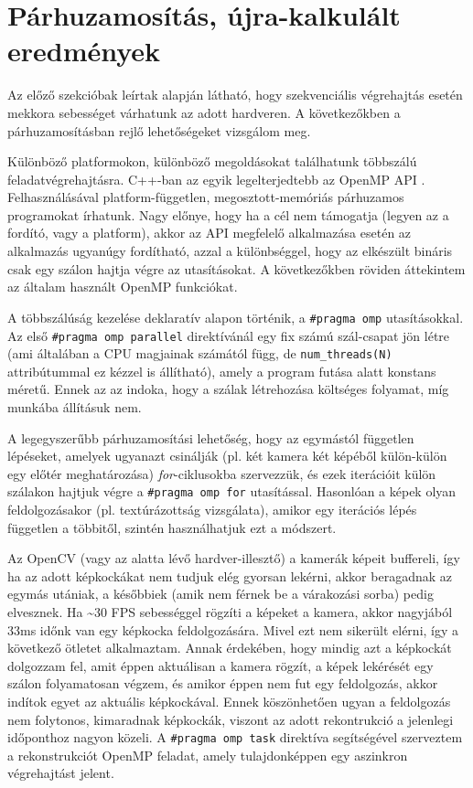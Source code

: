 \section{Párhuzamosítás, újra-kalkulált eredmények}

Az előző szekcióbak leírtak alapján látható, hogy szekvenciális végrehajtás esetén mekkora sebességet várhatunk az adott hardveren. A következőkben a párhuzamosításban rejlő lehetőségeket vizsgálom meg.

Különböző platformokon, különböző megoldásokat találhatunk többszálú feladatvégrehajtásra. C++-ban az egyik legelterjedtebb az OpenMP API \cite{OpenMP, OpenMP-specs}. Felhasználásával platform-független, megosztott-memóriás párhuzamos programokat írhatunk. Nagy előnye, hogy ha a cél nem támogatja (legyen az a fordító, vagy a platform), akkor az API megfelelő alkalmazása esetén az alkalmazás ugyanúgy fordítható, azzal a különbséggel, hogy az elkészült bináris csak egy szálon hajtja végre az utasításokat. A következőkben röviden áttekintem az általam használt OpenMP funkciókat.

A többszálúság kezelése deklaratív alapon történik, a \texttt{\#pragma omp} utasításokkal. Az első \texttt{\#pragma omp parallel} direktívánál egy fix számú szál-csapat jön létre (ami általában a CPU magjainak számától függ, de \texttt{num\_threads(N)} attribútummal ez kézzel is állítható), amely a program futása alatt konstans méretű. Ennek az az indoka, hogy a szálak létrehozása költséges folyamat, míg munkába állításuk nem.

A legegyszerűbb párhuzamosítási lehetőség, hogy az egymástól független lépéseket, amelyek ugyanazt csinálják (pl. két kamera két képéből külön-külön egy előtér meghatározása) \textit{for}-ciklusokba szervezzük, és ezek iterációit külön szálakon hajtjuk végre a \texttt{\#pragma omp for} utasítással. Hasonlóan a képek olyan feldolgozásakor (pl. textúrázottság vizsgálata), amikor egy iterációs lépés független a többitől, szintén használhatjuk ezt a módszert.

Az OpenCV (vagy az alatta lévő hardver-illesztő) a kamerák képeit buffereli, így ha az adott képkockákat nem tudjuk elég gyorsan lekérni, akkor beragadnak az egymás utániak, a későbbiek (amik nem férnek be a várakozási sorba) pedig elvesznek. Ha \textasciitilde{}30 FPS sebességgel rögzíti a képeket a kamera, akkor nagyjából 33ms időnk van egy képkocka feldolgozására. Mivel ezt nem sikerült elérni, így a következő ötletet alkalmaztam. Annak érdekében, hogy mindig azt a képkockát dolgozzam fel, amit éppen aktuálisan a kamera rögzít, a képek lekérését egy szálon folyamatosan végzem, és amikor éppen nem fut egy feldolgozás, akkor indítok egyet az aktuális képkockával. Ennek köszönhetően ugyan a feldolgozás nem folytonos, kimaradnak képkockák, viszont az adott rekontrukció a jelenlegi időponthoz nagyon közeli. A \texttt{\#pragma omp task} direktíva segítségével szerveztem a rekonstrukciót OpenMP feladat, amely tulajdonképpen egy aszinkron végrehajtást jelent.

